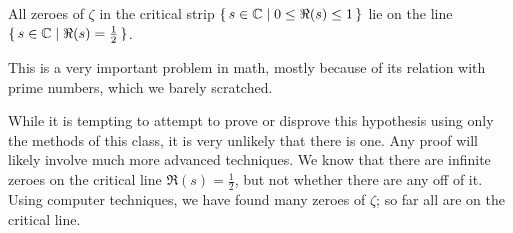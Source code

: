 \begin{hypothesis}[Riemann]
All zeroes of $\zeta$ in the critical strip $\set{ s\in \mathbb{C}\mid 0 \leq \Re(s) \leq 1}$ lie on the line $\set{ s\in \mathbb{C}\mid \Re(s) = \frac{1}{2}}$.
\end{hypothesis}

This is a very important problem in math, mostly because of its relation with prime numbers, which we barely scratched.

\begin{remark}
While it is tempting to attempt to prove or disprove this hypothesis using only the methods of this class, it is very unlikely that there is one. Any proof will likely involve much more advanced techniques. We know that there are infinite zeroes on the critical line $\Re(s) = \frac{1}{2}$, but not whether there are any off of it. Using computer techniques, we have found many zeroes of $\zeta$; so far all are on the critical line.
\end{remark}